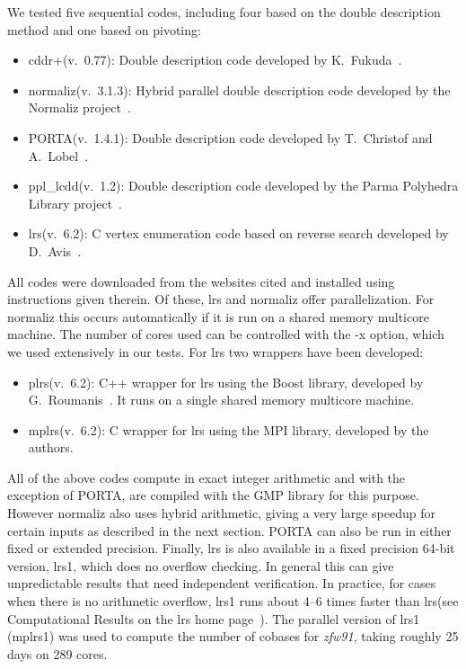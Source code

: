 \documentclass[a4paper,11pt]{article}   \usepackage{authblk} \usepackage[top=1.9cm,bottom=1.9cm,left=1.9cm,right=1.9cm]{geometry}
\newcommand{\progname}{\textsf}
\newcommand{\lrs}{\progname{lrs}\xspace}
\newcommand{\plrs}{\progname{plrs}\xspace}
\newcommand{\mplrs}{\progname{mplrs}\xspace}
\newcommand{\lrsa}{\progname{lrs1}\xspace}
\newcommand{\mplrsa}{\progname{mplrs1}\xspace}
\newcommand{\normaliz}{\progname{normaliz}\xspace}
\newcommand{\cdd}{\progname{cddr+}\xspace}
\newcommand{\porta}{\progname{PORTA}\xspace}
\newcommand{\ppl}{\progname{ppl\_lcdd}\xspace}
\newcommand{\polytope}{\emph}
\newcommand{\zfw}{\polytope{zfw91}\xspace}
\begin{document}
We tested five sequential codes, including four based on the
double description method and one based on pivoting:
\begin{itemize}
\item
\cdd(v.\ 0.77): Double description code developed by K.\ Fukuda~\cite{cdd}.
\item
\normaliz(v.\ 3.1.3): Hybrid parallel double description code developed by the Normaliz project~\cite{norm}.
\item
\porta(v.\ 1.4.1): Double description code developed by T.\ Christof and A.\ Lobel~\cite{porta}.
\item
\ppl(v.\ 1.2): Double description code developed by the Parma Polyhedra Library project~\cite{ppl}.
\item
\lrs(v.\ 6.2): C vertex enumeration code based on reverse search developed by D.\ Avis~\cite{lrs}.
\end{itemize}
\noindent
All codes were downloaded from the websites cited and installed using instructions given therein.
Of these, \lrs and \normaliz offer parallelization. For \normaliz this
occurs automatically if it is run on a shared memory multicore machine.
The number of cores used can be controlled with the -x option, which we used extensively in our tests.
For \lrs two wrappers have been developed:
\begin{itemize}
\item
\plrs(v.\ 6.2): C++ wrapper for \lrs using the Boost library, developed by G.\ Roumanis~\cite{AR13}.
It runs on a single shared memory multicore machine.
\item
\mplrs(v.\ 6.2): C wrapper for \lrs using the MPI library, developed by the authors.
\end{itemize}
\noindent

All of the above codes compute in exact integer arithmetic and with the
exception of \porta, are compiled with the GMP library for this purpose.
However \normaliz also uses hybrid arithmetic, giving a very large speedup for
certain inputs as described in the next section.
\porta can also be run in either fixed or extended precision.
Finally, \lrs is also available in a fixed precision 64-bit version, \lrsa, which does no overflow checking.
In general this can give unpredictable results that need independent verification.
In practice, for cases when there is no arithmetic overflow,
\lrsa runs about 4--6 times faster than \lrs (see Computational Results on
the \lrs home page~\cite{lrs}).
The parallel version of \lrsa
(\mplrsa) was used to compute the number of cobases for \zfw, taking roughly 25 days on 289 cores.
\end{document}
